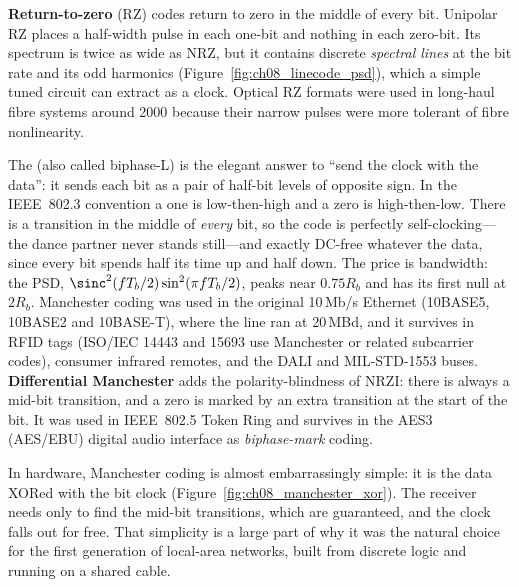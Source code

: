 \textbf{Return-to-zero} (RZ) codes return to zero in the middle of every
bit. Unipolar RZ places a half-width pulse in each one-bit and nothing in each zero-bit. Its
spectrum is twice as wide as NRZ, but it contains discrete \emph{spectral lines} at the bit
rate and its odd harmonics (Figure~\ref{fig:ch08_linecode_psd}), which a simple tuned circuit
can extract as a clock. Optical RZ formats were used in long-haul fibre systems around 2000
because their narrow pulses were more tolerant of fibre nonlinearity.

The  (also called biphase-L) is the elegant answer to ``send the clock
with the data'': it sends each bit as a pair of half-bit levels of opposite sign. In the
IEEE~802.3 convention a one is low-then-high and a zero is high-then-low. There is a
transition in the middle of \emph{every} bit, so the code is perfectly self-clocking---the
dance partner never stands still---and exactly DC-free whatever the data, since every bit
spends half its time up and half down. The price is bandwidth: the PSD,
$\sinc^2(fT_b/2)\sin^2(\pi fT_b/2)$, peaks near $0.75R_b$ and has its first null at $2R_b$.
Manchester coding was used in the original 10\,Mb/s Ethernet (10BASE5, 10BASE2 and
10BASE-T), where the line ran at 20\,MBd, and it survives in RFID tags (ISO/IEC 14443 and
15693 use Manchester or related subcarrier codes), consumer infrared remotes, and the DALI
and MIL-STD-1553 buses. \textbf{Differential Manchester} adds
the polarity-blindness of NRZI: there is always a mid-bit transition, and a zero is marked by
an extra transition at the start of the bit. It was used in IEEE~802.5 Token Ring and
survives in the AES3 (AES/EBU) digital audio interface as \emph{biphase-mark} coding.

In hardware, Manchester coding is almost embarrassingly simple: it is the data XORed with the
bit clock (Figure~\ref{fig:ch08_manchester_xor}). The receiver needs only to find the mid-bit
transitions, which are guaranteed, and the clock falls out for free. That simplicity is a large
part of why it was the natural choice for the first generation of local-area networks, built
from discrete logic and running on a shared cable.


